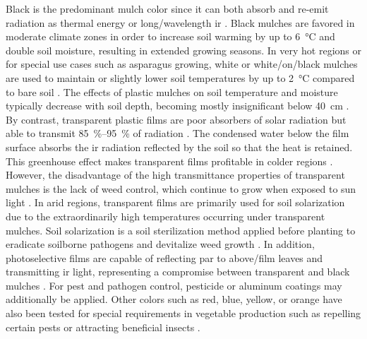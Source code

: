 Black is the predominant mulch color since it can both absorb and re-emit radiation as thermal energy or long\-/wavelength \ac{ir} \citep{LamontPlastic1993,LamontPlastics2005}. Black mulch\-es are favored in moderate climate zones in order to increase soil warming by up to \SI{6}{\degreeCelsius} and double soil moisture, resulting in extended growing seasons. In very hot regions or for special use cases such as asparagus growing, white or white\-/on\-/black mulches are used to maintain or slightly lower soil temperatures by up to \SI{2}{\degreeCelsius} compared to bare soil \citep{HamOptical1993,HeissnerComparison2005}. The effects of plastic mulches on soil temperature and moisture typically decrease with soil depth, becoming mostly insignificant below \SI{40}{\centi\meter} \citep{Diaz-HernandezEffects2012,HeissnerComparison2005}. By contrast, transparent plastic films are poor absorbers of solar radiation but able to transmit \SIrange{85}{95}{\percent} of radiation \citep{HamOptical1993}. The condensed water below the film surface absorbs the \ac{ir} radiation reflected by the soil so that the heat is retained. This greenhouse effect makes transparent films profitable in colder regions \citep[for instance,][]{HaynesUse1987,StreckEffect1995}. However, the disadvantage of the high transmittance properties of transparent mulches is the lack of weed control, which continue to grow when exposed to sun light \citep{LamontPlastic1993}. In arid regions, transparent films are primarily used for soil solarization due to the extraordinarily high temperatures occurring under transparent mulches. Soil solarization is a soil sterilization method applied before planting to eradicate soilborne pathogens and devitalize weed growth \citep{HorowitzSolarization1983,TamiettiSoil2006}. In addition, photoselective films are capable of reflecting \ac{par} to above\-/film leaves and transmitting \ac{ir} light, representing a compromise between transparent and black mulches \citep{PaulUse2005}. For pest and pathogen control, pesticide \citep{SubrahmaniyanWeed2011} or aluminum \citep{CsizinszkyColor1995} coatings may additionally be applied. Other colors such as red, blue, yellow, or orange have also been tested for special requirements in vegetable production such as repelling certain pests or attracting beneficial insects \citep{CsizinszkyColor1995,LamontPainting1990, OrzolekUse1993}.

